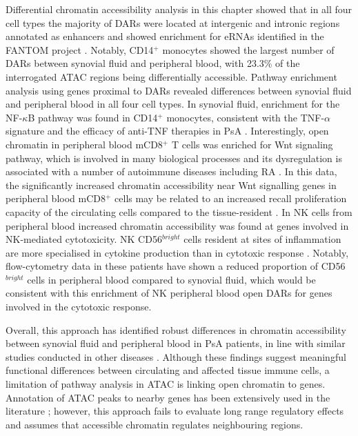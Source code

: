 Differential chromatin accessibility analysis in this chapter showed that in all four cell types the majority of DARs were located at intergenic and intronic regions annotated as enhancers and showed enrichment for eRNAs identified in the FANTOM project \parencite{FANTOM2014}. Notably, CD14$^+$ monocytes showed the largest number of DARs between synovial fluid and peripheral blood, with 23.3\% of the interrogated ATAC regions being differentially accessible. Pathway enrichment analysis using genes proximal to DARs revealed differences between synovial fluid and peripheral blood in all four cell types. In synovial fluid, enrichment for the NF-$\kappa$B pathway was found in CD14$^+$ monocytes, consistent with the TNF-$\alpha$ signature and the efficacy of anti-TNF therapies in PsA \parencite{Mahil2016}. Interestingly, open chromatin in peripheral blood mCD8$^+$ T cells was enriched for Wnt signaling pathway, which is involved in many biological processes and its dysregulation is associated with a number of autoimmune diseases including RA \parencite{Miao2013}. In this data, the significantly increased chromatin accessibility near Wnt signalling genes in peripheral blood mCD8$^+$ cells may be related to an increased recall proliferation capacity of the circulating cells compared to the tissue-resident \parencite{Boudousquie2014}. In NK cells from peripheral blood increased chromatin accessibility was found at genes involved in NK-mediated cytotoxicity. NK CD56$^{bright}$ cells resident at sites of inflammation are more specialised in cytokine production than in cytotoxic response \parencite{Michel2016}. Notably, flow-cytometry data in these patients have shown a reduced proportion of CD56$^{bright}$ cells in peripheral blood compared to synovial fluid, which would be consistent with this enrichment of NK peripheral blood open DARs for genes involved in the cytotoxic response.

Overall, this approach has identified robust differences in chromatin accessibility between synovial fluid and peripheral blood in PsA patients, in line with similar studies conducted in other diseases \parencite{Scharer2016,Wang2018,Corces2016}. Although these findings suggest meaningful functional differences between circulating and affected tissue immune cells, a limitation of pathway analysis in ATAC is linking open chromatin to genes. Annotation of ATAC peaks to nearby genes has been extensively used in the literature \parencite{Scharer2016,Ackermann2016, Corces2016, Wang2018}; however, this approach fails to evaluate long range regulatory effects and assumes that accessible chromatin regulates neighbouring regions. %
   

